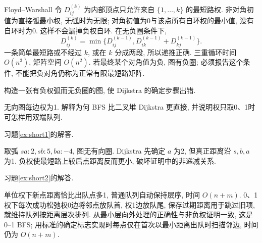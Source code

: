 Floyd--Warshall 令 $D^{(k)}_{ij}$ 为内部顶点只允许来自 $\{1,\ldots,k\}$ 的最短路权. 非对角初值为直接弧最小权, 无弧时为无限; 对角初值为0与该点所有自环权的最小值, 没有自环时为0. 这样不会漏掉负权自环. 在无负圈条件下,
\[
D^{(k)}_{ij}=\min\{D^{(k-1)}_{ij},D^{(k-1)}_{ik}+D^{(k-1)}_{kj}\}.
\]
一条简单最短路或不经过 $k$, 或在 $k$ 分成两段, 所以递推正确. 三重循环时间 $O(n^3)$, 矩阵空间 $O(n^2)$. 若最终某个对角值为负, 图有负圈; 必须报告这个条件, 不能把负对角仍称为正常有限最短路矩阵.
\begin{exercise}\label{ex:short1}
构造一张有负权弧而无负圈的图, 使 Dijkstra 的确定步骤出错.
\end{exercise}
\begin{exercise}\label{ex:short2}
无向图每边权为1. 解释为何 BFS 比二叉堆 Dijkstra 更直接, 并说明权只取0、1时可怎样用双端队列.
\end{exercise}
习题\ref{ex:short1}的解答.
\begin{solution}
取弧 $sa:2,sb:5,ba:-4$, 图无有向圈. Dijkstra 先确定 $a$ 为2, 但真正距离沿 $s,b,a$ 为1. 负权使最短路上较后点距离反而更小, 破坏证明中的非递减关系.
\end{solution}
习题\ref{ex:short2}的解答.
\begin{solution}
单位权下新点距离恰比出队点多1, 普通队列自动保持层序, 时间 $O(n+m)$. 0、1权下每次成功松弛权0边将邻点放队首, 权1边放队尾, 保存过期距离用于跳过旧项, 就维持队列按距离层次排列. 从最小层向外处理的正确性与非负权证明一致, 这是0--1 BFS; 用标准的确定标志实现时每点仅在首次以最小距离出队时扫描邻边, 时间仍为 $O(n+m)$.
\end{solution}
